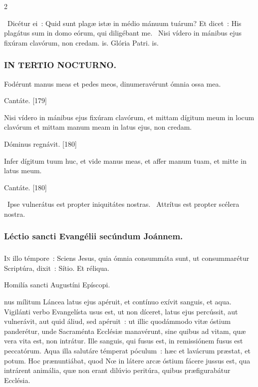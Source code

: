 \documentclass[9pt,twoside]{extarticle}
\begin{document}
\begin{multicols}{2}
\begin{tightlist}{}
\item {}~Dicétur ei~: Quid sunt plagæ istæ in médio mánuum tuárum? Et dicet~: \textred{*} His plagátus sum in domo eórum, qui diligébant me. ~Nisi vídero in mánibus ejus fixúram clavórum, non credam. is. Glória Patri. is.
\end{tightlist}

\subsubsection*{\center \textsc{IN TERTIO NOCTURNO.}}
\begin{tightlist}{}
\item {} Fodérunt manus meas et pedes meos, dinumeravérunt ómnia ossa mea.
\item {} Cantáte. [179]
\item {} Nisi vídero in mánibus ejus fixúram clavórum, et mittam dígitum meum in locum clavórum et mittam manum meam in latus ejus, non credam.
\item {} Dóminus regnávit. [180]
\item {} Infer dígitum tuum huc, et vide manus meas, et affer manum tuam, et mitte in latus meum.
\item {} Cantáte. [180]
\item {}~Ipse vulnerátus est propter iniquitátes nostras. ~Attrítus est propter scélera nostra.
\end{tightlist}

\subsubsection*{\center Léctio sancti Evangélii secúndum Joánnem.}
\subsubsection*{\center {}}
\lettrine{I}n illo témpore~: Sciens Jesus, quia ómnia consummáta sunt, ut consummarétur Scriptúra, dixit~: Sítio. Et réliqua.

\begin{center}Homilía sancti Augustíni Epíscopi.\\ \end{center}
nus mílitum Láncea latus ejus apéruit, et contínuo exívit sanguis, et aqua. Vigilánti verbo Evangelísta usus est, ut non díceret, latus ejus percússit, aut vulnerávit, aut quid áliud, sed apéruit~: ut illic quodámmodo vitæ óstium panderétur, unde Sacraménta Ecclésiæ manavérunt, sine quibus ad vitam, quæ vera vita est, non intrátur. Ille sanguis, qui fusus est, in remissiónem fusus est peccatórum. Aqua illa salutáre témperat póculum~: hæc et lavácrum præstat, et potum. Hoc prænuntiábat, quod Nœ in látere arcæ óstium fácere jussus est, qua intrárent animália, quæ non erant dilúvio peritúra, quibus præfigurabátur Ecclésia.


\end{multicols}
\end{document}
